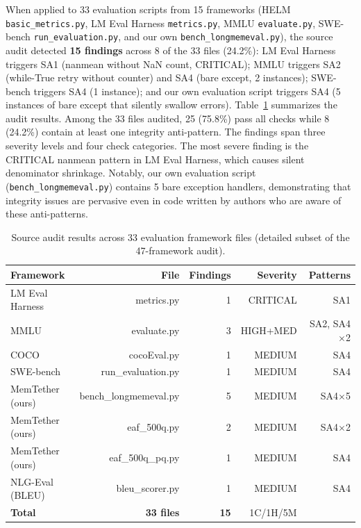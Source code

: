\documentclass[11pt]{article}
\begin{document}
When applied to 33 evaluation scripts from 15 frameworks (HELM \texttt{basic\_metrics.py}, LM Eval Harness \texttt{metrics.py}, MMLU \texttt{evaluate.py}, SWE-bench \texttt{run\_evaluation.py}, and our own \texttt{bench\_longmemeval.py}), the source audit detected \textbf{15 findings} across 8 of the 33 files (24.2\%): LM Eval Harness triggers SA1 (nanmean without NaN count, CRITICAL); MMLU triggers SA2 (while-True retry without counter) and SA4 (bare except, 2 instances); SWE-bench triggers SA4 (1 instance); and our own evaluation script triggers SA4 (5 instances of bare except that silently swallow errors). Table~\ref{tab:source_audit} summarizes the audit results. Among the 33 files audited, 25 (75.8\%) pass all checks while 8 (24.2\%) contain at least one integrity anti-pattern. The findings span three severity levels and four check categories. The most severe finding is the CRITICAL nanmean pattern in LM Eval Harness, which causes silent denominator shrinkage. Notably, our own evaluation script (\texttt{bench\_longmemeval.py}) contains 5 bare exception handlers, demonstrating that integrity issues are pervasive even in code written by authors who are aware of these anti-patterns.

\begin{table}[h]
\centering
\caption{Source audit results across 33 evaluation framework files (detailed subset of the 47-framework audit).}
\label{tab:source_audit}
\begin{tabular}{lrrrr}
\toprule
Framework & File & Findings & Severity & Patterns \\
\midrule
LM Eval Harness & metrics.py & 1 & CRITICAL & SA1 \\
MMLU & evaluate.py & 3 & HIGH+MED & SA2, SA4$\times$2 \\
COCO & cocoEval.py & 1 & MEDIUM & SA4 \\
SWE-bench & run\_evaluation.py & 1 & MEDIUM & SA4 \\
MemTether (ours) & bench\_longmemeval.py & 5 & MEDIUM & SA4$\times$5 \\
MemTether (ours) & eaf\_500q.py & 2 & MEDIUM & SA4$\times$2 \\
MemTether (ours) & eaf\_500q\_pq.py & 1 & MEDIUM & SA4 \\
NLG-Eval (BLEU) & bleu\_scorer.py & 1 & MEDIUM & SA4 \\
\midrule
\textbf{Total} & \textbf{33 files} & \textbf{15} & 1C/1H/5M & \\
\bottomrule
\end{tabular}
\end{table}
\end{document}
